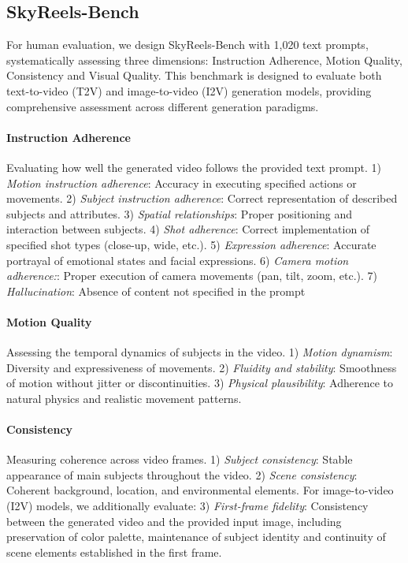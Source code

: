 \documentclass{article}
\begin{document}
{\subsection{SkyReels-Bench}
For human evaluation, we design SkyReels-Bench with 1,020 text prompts, systematically assessing three dimensions: Instruction Adherence, Motion Quality, Consistency and Visual Quality. This benchmark is designed to evaluate both text-to-video (T2V) and image-to-video (I2V) generation models, providing comprehensive assessment across different generation paradigms.

\paragraph{Instruction Adherence}
 Evaluating how well the generated video follows the provided text prompt.
1) \emph{Motion instruction adherence}: Accuracy in executing specified actions or movements. 
2) \emph{Subject instruction adherence}: Correct representation of described subjects and attributes.
3) \emph{Spatial relationships}: Proper positioning and interaction between subjects.
4) \emph{Shot adherence}: Correct implementation of specified shot types (close-up, wide, etc.). 
5) \emph{Expression adherence}: Accurate portrayal of emotional states and facial expressions.
6) \emph{Camera motion adherence:}: Proper execution of camera movements (pan, tilt, zoom, etc.).
7) \emph{Hallucination}: Absence of content not specified in the prompt

\paragraph{Motion Quality} Assessing the temporal dynamics of subjects in the video.
1) \emph{Motion dynamism}: Diversity and expressiveness of movements.
2) \emph{Fluidity and stability}: Smoothness of motion without jitter or discontinuities.
3) \emph{Physical plausibility}: Adherence to natural physics and realistic movement patterns.

\paragraph{Consistency} Measuring coherence across video frames.
1) \emph{Subject consistency}: Stable appearance of main subjects throughout the video.
2) \emph{Scene consistency}: Coherent background, location, and environmental elements.
For image-to-video (I2V) models, we additionally evaluate:
3) \emph{First-frame fidelity}: Consistency between the generated video and the provided input image, including preservation of color palette, maintenance of subject identity and continuity of scene elements established in the first frame.

}
\end{document}
